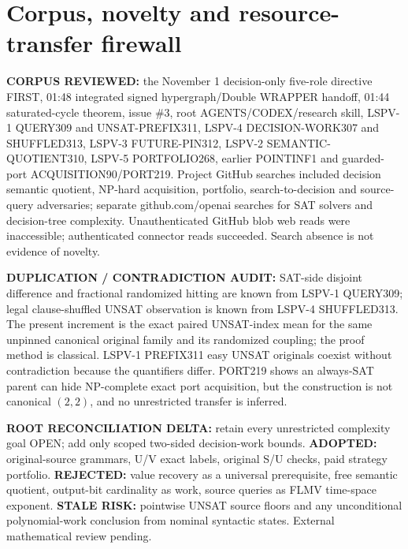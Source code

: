 \documentclass[11pt]{article}
\begin{document}
\section{Corpus, novelty and resource-transfer firewall}
\noindent\textbf{CORPUS REVIEWED:} the November 1 decision-only five-role directive FIRST, 01:48 integrated signed hypergraph/Double WRAPPER handoff, 01:44 saturated-cycle theorem, issue \#3, root AGENTS/CODEX/research skill, LSPV-1 QUERY309 and UNSAT-PREFIX311, LSPV-4 DECISION-WORK307 and SHUFFLED313, LSPV-3 FUTURE-PIN312, LSPV-2 SEMANTIC-QUOTIENT310, LSPV-5 PORTFOLIO268, earlier POINTINF1 and guarded-port ACQUISITION90/PORT219. Project GitHub searches included decision semantic quotient, NP-hard acquisition, portfolio, search-to-decision and source-query adversaries; separate github.com/openai searches for SAT solvers and decision-tree complexity. Unauthenticated GitHub blob web reads were inaccessible; authenticated connector reads succeeded. Search absence is not evidence of novelty.
\par\noindent\textbf{DUPLICATION / CONTRADICTION AUDIT:} SAT-side disjoint difference and fractional randomized hitting are known from LSPV-1 QUERY309; legal clause-shuffled UNSAT observation is known from LSPV-4 SHUFFLED313. The present increment is the exact paired UNSAT-index mean for the same unpinned canonical original family and its randomized coupling; the proof method is classical. LSPV-1 PREFIX311 easy UNSAT originals coexist without contradiction because the quantifiers differ. PORT219 shows an always-SAT parent can hide NP-complete exact port acquisition, but the construction is not canonical $(2,2)$, and no unrestricted transfer is inferred.
\par\noindent\textbf{ROOT RECONCILIATION DELTA:} retain every unrestricted complexity goal OPEN; add only scoped two-sided decision-work bounds. \textbf{ADOPTED:} original-source grammars, U/V exact labels, original S/U checks, paid strategy portfolio. \textbf{REJECTED:} value recovery as a universal prerequisite, free semantic quotient, output-bit cardinality as work, source queries as FLMV time-space exponent. \textbf{STALE RISK:} pointwise UNSAT source floors and any unconditional polynomial-work conclusion from nominal syntactic states. External mathematical review pending.
\end{document}
